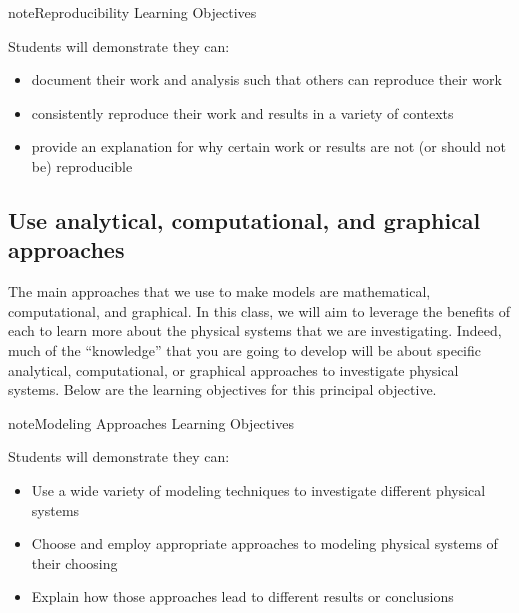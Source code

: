 \documentclass[letterpaper,10pt,english]{jupyterBook}
\begin{document}
\begin{sphinxadmonition}{note}{Reproducibility Learning Objectives}

\sphinxAtStartPar
Students will demonstrate they can:
\begin{itemize}
\item {} 
\sphinxAtStartPar
document their work and analysis such that others can reproduce their work

\item {} 
\sphinxAtStartPar
consistently reproduce their work and results in a variety of contexts

\item {} 
\sphinxAtStartPar
provide an explanation for why certain work or results are not (or should not be) reproducible

\end{itemize}
\end{sphinxadmonition}


\subsection{Use analytical, computational, and graphical approaches}
\label{\detokenize{content/0_course/goals:use-analytical-computational-and-graphical-approaches}}
\sphinxAtStartPar
The main approaches that we use to make models are mathematical, computational, and graphical. In this class, we will aim to leverage the benefits of each to learn more about the physical systems that we are investigating. Indeed, much of the “knowledge” that you are going to develop will be about specific analytical, computational, or graphical approaches to investigate physical systems. Below are the learning objectives for this principal objective.

\begin{sphinxadmonition}{note}{Modeling Approaches Learning Objectives}

\sphinxAtStartPar
Students will demonstrate they can:
\begin{itemize}
\item {} 
\sphinxAtStartPar
Use a wide variety of modeling techniques to investigate different physical systems

\item {} 
\sphinxAtStartPar
Choose and employ appropriate approaches to modeling physical systems of their choosing

\item {} 
\sphinxAtStartPar
Explain how those approaches lead to different results or conclusions

\end{itemize}
\end{sphinxadmonition}
\end{document}
